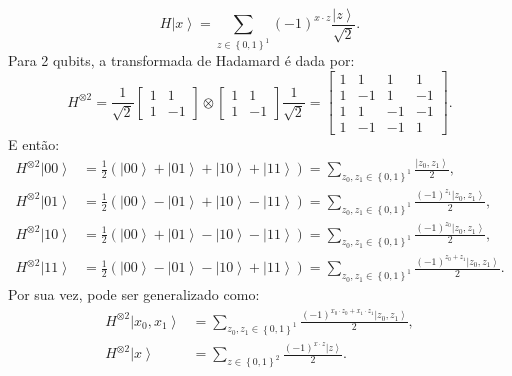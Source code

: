 \begin{equation}
H\left|x\right\rangle =\sum_{z\in\left\{ 0,1\right\} ^{1}}\left(-1\right)^{x\cdot z}\frac{\left|z\right\rangle }{\sqrt{2}}
. \end{equation}
Para 2 qubits, a transformada de Hadamard é dada por:
\begin{equation}
H^{\otimes2}=\frac{1}{\sqrt{2}}\left[\begin{array}{cc}
1 & 1\\
1 & -1
\end{array}\right]\otimes\left[\begin{array}{cc}
1 & 1\\
1 & -1
\end{array}\right]\frac{1}{\sqrt{2}}=\left[\begin{array}{cccc}
1 & 1 & 1 & 1\\
1 & -1 & 1 & -1\\
1 & 1 & -1 & -1\\
1 & -1 & -1 & 1
\end{array}\right]
. \end{equation}
E então:
\begin{equation}
\begin{split}
H^{\otimes2}\left|00\right\rangle & =\frac{1}{2}\left(\left|00\right\rangle +\left|01\right\rangle +\left|10\right\rangle +\left|11\right\rangle \right)=\sum_{z_{0},z_{1}\in\left\{ 0,1\right\} ^{1}} \frac{\left|z_{0},z_{1}\right\rangle }{{2}}, \\
H^{\otimes2}\left|01\right\rangle & =\frac{1}{2}\left(\left|00\right\rangle -\left|01\right\rangle +\left|10\right\rangle -\left|11\right\rangle \right)=\sum_{z_{0},z_{1}\in\left\{ 0,1\right\} ^{1}} \frac{\left(-1\right)^{z_{1}}\left|z_{0},z_{1}\right\rangle }{2}, \\
H^{\otimes2}\left|10\right\rangle & =\frac{1}{2}\left(\left|00\right\rangle +\left|01\right\rangle -\left|10\right\rangle -\left|11\right\rangle \right)=\sum_{z_{0},z_{1}\in\left\{ 0,1\right\} ^{1}} \frac{\left(-1\right)^{z_{0}}\left|z_{0},z_{1}\right\rangle }{2}, \\
H^{\otimes2}\left|11\right\rangle & =\frac{1}{2}\left(\left|00\right\rangle -\left|01\right\rangle -\left|10\right\rangle +\left|11\right\rangle \right)=\sum_{z_{0},z_{1}\in\left\{ 0,1\right\} ^{1}} \frac{\left(-1\right)^{z_{0}+z_{1}}\left|z_{0},z_{1}\right\rangle }{2}.
\end{split}
\end{equation}
Por sua vez, pode ser generalizado como:
\begin{equation}
\begin{split}
H^{\otimes2}\left|x_{0},x_{1}\right\rangle & =\sum_{z_{0},z_{1}\in\left\{ 0,1\right\} ^{1}}\frac{\left(-1\right)^{x_{0}\cdot z_{0}+x_{1}\cdot z_{1}}\left|z_{0},z_{1}\right\rangle }{2}, \\
H^{\otimes2}\left|x\right\rangle & =\sum_{z\in\left\{ 0,1\right\} ^{2}}\frac{\left(-1\right)^{x\cdot z}\left|z\right\rangle }{2} .
\end{split}
\end{equation}
